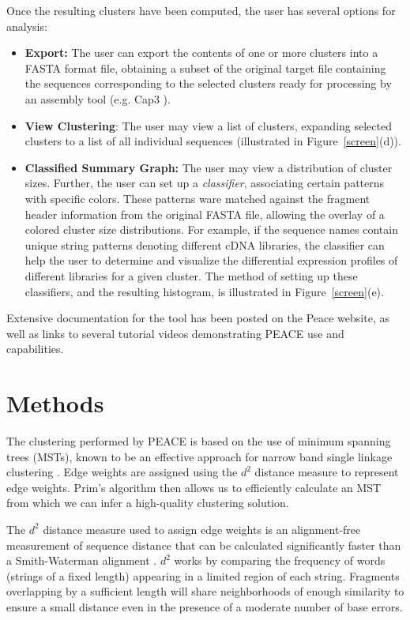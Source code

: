 \documentclass[a4,center,fleqn]{NAR}
\newcommand{\peace} {{\small PEACE}}
\begin{document}
 Once the resulting clusters have been
computed, the user has several options for analysis:
\begin{itemize}
\item {\bf Export:} The user can export the contents of one or more
  clusters into a FASTA format file, obtaining a subset of the
  original target file containing the sequences corresponding to the
  selected clusters ready for processing by an assembly tool
  (e.g. {\sc Cap3} \cite{Huang99}).
\item {\bf View Clustering}: The user may view a list of clusters,
  expanding selected clusters to a list of all individual sequences
  (illustrated in Figure~\ref{screen}(d)).
\item {\bf Classified Summary Graph:} The user may view a distribution
  of cluster sizes.  Further, the user can set up a {\it classifier},
  associating certain patterns with specific colors.  These patterns
  ware matched against the fragment header information from the
  original FASTA file, allowing the overlay of a colored cluster size
  distributions.  For example, if the sequence names contain unique
  string patterns denoting different cDNA libraries, the classifier
  can help the user to determine and visualize the differential
  expression profiles of different libraries for a given cluster.  The
  method of setting up these classifiers, and the resulting histogram,
  is illustrated in Figure~\ref{screen}(e).
\end{itemize}
Extensive documentation for the tool has been posted on the {\sc
  Peace} website, as well as links to several tutorial videos
demonstrating \peace\/ use and capabilities.


\section{Methods}

The clustering performed by \peace\/ is based on the use of minimum
spanning trees (MSTs), known to be an effective approach for narrow
band single linkage clustering \cite{Jain99,Wan08}. Edge weights are
assigned using the $d^2$ distance measure \cite{Hide94} to represent
edge weights.  Prim's algorithm \cite{Prim57} then allows us to
efficiently calculate an MST from which we can infer a high-quality
clustering solution.

The $d^2$ distance measure used to assign edge weights is an
alignment-free measurement of sequence distance that can be calculated
significantly faster than a Smith-Waterman alignment \cite{Hide94}.
$d^2$ works by comparing the frequency of words (strings of a fixed
length) appearing in a limited region of each string.  Fragments
overlapping by a sufficient length will share neighborhoods of enough
similarity to ensure a small distance even in the presence of a
moderate number of base errors.
\end{document}
